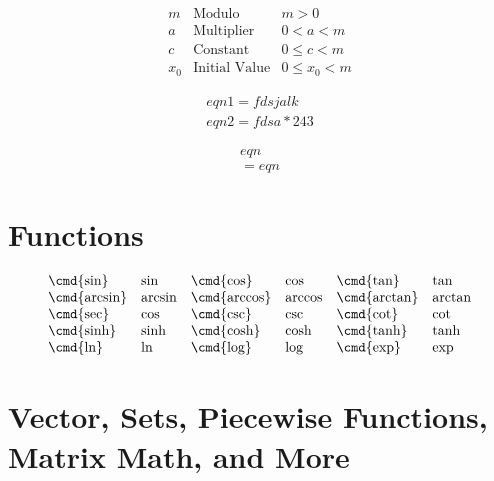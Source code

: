 		\begin{equation*}
			\begin{array}{lll}
				m   & \text{Modulo}        & m>0\\
				a   & \text{Multiplier}    & 0<a<m\\
				c   & \text{Constant}      & 0\leq c<m\\
				x_0 & \text{Initial Value} & 0\leq x_0 <m
			\end{array}
		\end{equation*}
		
		\begin{gather}
			eqn1 = fdsjalk \\
			eqn2 = fdsa * 243
		\end{gather}
		
		\begin{multline}
			eqn \\
			= eqn
		\end{multline}
	\section{Functions}
		
		\begin{equation*}
			\begin{array}{llllll}
				\text{\cmd{sin}} & \sin & \text{\cmd{cos}} & \cos & \text{\cmd{tan}} & \tan \\
				\text{\cmd{arcsin}} & \arcsin & \text{\cmd{arccos}} & \arccos & \text{\cmd{arctan}} & \arctan \\
				\text{\cmd{sec}} & \cos & \text{\cmd{csc}} & \csc & \text{\cmd{cot}} & \cot \\
				\text{\cmd{sinh}} & \sinh & \text{\cmd{cosh}} & \cosh & \text{\cmd{tanh}} & \tanh \\
				\text{\cmd{ln}} & \ln & \text{\cmd{log}} & \log & \text{\cmd{exp}} & \exp \\
			\end{array}
		\end{equation*}
	\section{}
	
	\section{Vector, Sets, Piecewise Functions, Matrix Math, and More}